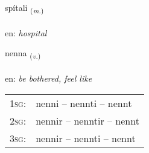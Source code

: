 \documentclass[frontgrid, backgrid]{flacards}\usepackage[]{graphicx}\usepackage[]{xcolor}
\begin{document}
\renewcommand{\blhead}{\vskip5pt {\small\bfseries\footnotesize Nafnorð | Noun }}
\renewcommand{\bcfoot}{\vskip5pt \hspace{2pt}{\small\bfseries\footnotesize 3K}}


{spítali \small{\textsubscript{(\textit{m.})}} \\[1ex] %
\textphonetic{[spiːtalɪ]} \\
en: \emph{hospital} \\  [2ex]
\renewcommand*{\arraystretch}{0.8}
}

\renewcommand{\flhead}{\vskip5pt \fboxsep=0pt {\small\bfseries\footnotesize Sagnorð | Verb}}
\renewcommand{\fcfoot}{\vskip5pt \fboxsep=0pt \hspace{2pt}{\small\bfseries\footnotesize 3K}}

\renewcommand{\blhead}{\vskip5pt {\small\bfseries\footnotesize Sagnorð | Verb }}
\renewcommand{\bcfoot}{\vskip5pt \hspace{2pt}{\small\bfseries\footnotesize 3K}}


{nenna \small{\textsubscript{(\textit{v.})}} \\[1ex] %
\textphonetic{[nɛna]} \\
en: \emph{be bothered, feel like} \\  [2ex]
\renewcommand*{\arraystretch}{0.8}
\begin{tabular}{p{1cm}l}
\textsc{1sg}: & nenni -- nennti -- nennt \\ 
\textsc{2sg}: & nennir -- nenntir -- nennt \\ 
\textsc{3sg}: & nennir -- nennti -- nennt \\ 
\end{tabular}
}

\renewcommand{\flhead}{\vskip5pt \fboxsep=0pt {\small\bfseries\footnotesize Nafnorð | Noun}}
\renewcommand{\fcfoot}{\vskip5pt \fboxsep=0pt \hspace{2pt}{\small\bfseries\footnotesize 3K}}
\end{document}

